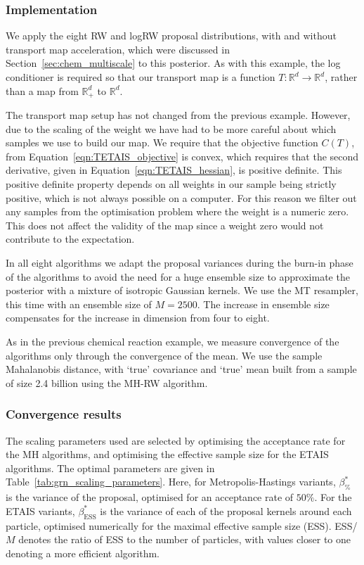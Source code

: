 \documentclass[final]{siamltex}
\begin{document}
\subsubsection{Implementation}

We apply the eight RW and logRW proposal distributions, with and
without transport map acceleration, which were discussed in
Section~\ref{sec:chem_multiscale} to this posterior. As with this
example, the log conditioner is required so that our transport map is a function $T\colon\mathbb{R}^d\rightarrow\mathbb{R}^d$, rather than a map from $\mathbb{R}_+^d$ to $\mathbb{R}^d$.

The transport map setup has not changed from the previous example. However, due to the scaling of the weight we have had to be more careful about which samples we use to build our map. We require that the objective function $C(T)$, from Equation~\eqref{eqn:TETAIS_objective} is convex, which requires that the second derivative, given in Equation~\eqref{eqn:TETAIS_hessian}, is positive definite. This positive definite property depends on all weights in our sample being strictly positive, which is not always possible on a computer. For this reason we filter out any samples from the optimisation problem where the weight is a numeric zero. This does not affect the validity of the map since a weight zero would not contribute to the expectation.

In all eight algorithms we adapt the proposal variances during the
burn-in phase of the algorithms to avoid the need for a huge ensemble size to approximate the posterior with a mixture of isotropic Gaussian kernels.
We use the MT resampler, this time with an ensemble size of $M=2500$. The increase in ensemble size compensates for the increase in dimension from four to eight.

As in the previous chemical reaction example, we measure convergence of the algorithms only through the convergence of the mean. We use the sample Mahalanobis distance, with `true' covariance and `true' mean built from a sample of size 2.4 billion using the MH-RW algorithm.

\subsubsection{Convergence results}

The scaling parameters used are selected by optimising the acceptance
rate for the MH algorithms, and optimising the effective sample size
for the ETAIS algorithms. The optimal parameters are given in
Table~\ref{tab:grn_scaling_parameters}. Here, for Metropolis-Hastings
variants, $\beta_{\%}^*$ is the variance of the proposal, optimised
for an acceptance rate of $50\%$. For the ETAIS variants,
$\beta_{\text{ESS}}^*$ is the variance of each of the proposal kernels
around each particle, optimised numerically for the maximal effective
sample size (ESS). ESS/$M$ denotes the ratio of ESS to the number of
particles, with values closer to one denoting a more efficient algorithm.
\end{document}
